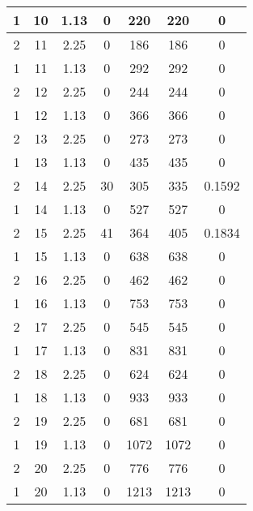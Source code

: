 \documentclass[letterpaper, 12pt]{article}
\begin{document}
\begin{longtable}{|c|c|c|c|c|c|c|}
\hline
1 & 10 & 1.13 & 0 & 220 & 220 & 0 \\
\hline
2 & 11 & 2.25 & 0 & 186 & 186 & 0 \\
\hline
1 & 11 & 1.13 & 0 & 292 & 292 & 0 \\
\hline
2 & 12 & 2.25 & 0 & 244 & 244 & 0 \\
\hline
1 & 12 & 1.13 & 0 & 366 & 366 & 0 \\
\hline
2 & 13 & 2.25 & 0 & 273 & 273 & 0 \\
\hline
1 & 13 & 1.13 & 0 & 435 & 435 & 0 \\
\hline
2 & 14 & 2.25 & 30 & 305 & 335 & 0.1592 \\
\hline
1 & 14 & 1.13 & 0 & 527 & 527 & 0 \\
\hline
2 & 15 & 2.25 & 41 & 364 & 405 & 0.1834 \\
\hline
1 & 15 & 1.13 & 0 & 638 & 638 & 0 \\
\hline
2 & 16 & 2.25 & 0 & 462 & 462 & 0 \\
\hline
1 & 16 & 1.13 & 0 & 753 & 753 & 0 \\
\hline
2 & 17 & 2.25 & 0 & 545 & 545 & 0 \\
\hline
1 & 17 & 1.13 & 0 & 831 & 831 & 0 \\
\hline
2 & 18 & 2.25 & 0 & 624 & 624 & 0 \\
\hline
1 & 18 & 1.13 & 0 & 933 & 933 & 0 \\
\hline
2 & 19 & 2.25 & 0 & 681 & 681 & 0 \\
\hline
1 & 19 & 1.13 & 0 & 1072 & 1072 & 0 \\
\hline
2 & 20 & 2.25 & 0 & 776 & 776 & 0 \\
\hline
1 & 20 & 1.13 & 0 & 1213 & 1213 & 0 \\
\hline
\end{longtable}
\end{document}
